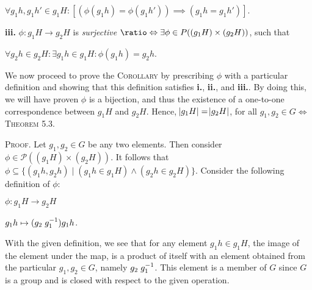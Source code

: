 \documentclass[12pt, a4paper]{article}
\newcommand*{\logeq}{\ratio\Leftrightarrow}
\begin{document}
\vspace{4mm}

\centerline{$\forall g_1 h,g_1 h'\in g_1 H\colon [(\phi(g_1 h)=\phi(g_1 h'))\implies(g_1 h=g_1 h')]$.}

\vspace{10mm}


\textbf{iii. } $\phi\colon g_1 H\longrightarrow g_2 H$ is \textit{surjective} $\logeq\exists\phi\in\mathscr{P}((g_1 H)\times(g_2 H))$, such that

\vspace{4mm}

\centerline{$\forall g_2 h\in g_2 H\colon\exists g_1 h\in g_1 H\colon\phi(g_1 h)=g_2 h$.}

\vspace{4mm}

\begin{flushleft}
We now proceed to prove the \textsc{Corollary} by prescribing $\phi$ with a particular definition and showing that this definition satisfies \textbf{i.}, \textbf{ii.}, and \textbf{iii.}. By doing this, we will have proven $\phi$ is a bijection, and thus the existence of a one-to-one correspondence between $g_1 H$ and $g_2 H$. Hence, $\abs{g_1 H}=\abs{g_2 H}$, for all $g_1,g_2\in G\Leftrightarrow$ \textsc{Theorem 5.3}.
\end{flushleft}

\newpage


\textsc{Proof. }Let $g_1,g_2\in G$ be any two elements. Then consider $\phi\in\mathscr{P}((g_1 H)\times(g_2 H))$. It follows that $\phi\subseteq\{(g_1 h, g_2 h)\mid (g_1 h\in g_1 H)\wedge(g_2 h\in g_2 H)\}$. Consider the following definition of $\phi$:

\vspace{2mm}

\centerline{$\phi\colon g_1 H\longrightarrow g_2 H$}

\vspace{4mm}

\centerline{$g_1 h\mapsto(g_2\hspace{1mm} g^{-1}_1)g_1 h$.}

\vspace{4mm}

With the given definition, we see that for any element $g_1 h\in g_1 H$, the image of the element under the map, is a product of itself with an element obtained from the particular $g_1,g_2\in G$, namely $g_2\hspace{1mm} g^{-1}_1$. This element is a member of $G$ since $G$ is a group and is closed with respect to the given operation. 
\end{document}
